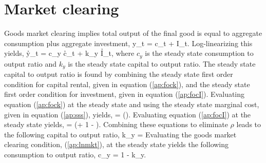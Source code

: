 \section{Market clearing}
Goods market clearing implies total output of the final good is equal to aggregate consumption plus aggregate investment,
\bdm y_t = c_t + I_t. \edm
Log-linearizing this yields,
\beq \label{ap:lnmkt} \h{y}_t = c_y \h{c}_t + \delta k_y \h{I}_t, \eeq
where $c_y$ is the steady state consumption to output ratio and $k_y$ is the steady state capital to output ratio.  The steady state capital to output ratio is found by combining the steady state first order condition for capital rental, given in equation (\ref{ap:fock}), and the steady state  first order condition for investment, given in equation (\ref{ap:focI}).  Evaluating equation (\ref{ap:fock}) at the steady state and using the steady state marginal cost, given in equation (\ref{ap:sss}), yields,
\bdm \rho = \alpha {} \left(\right). \edm
Evaluating equation (\ref{ap:focI}) at the steady state yields,
 = \beta \left(\rho + 1 - \delta \right). \edm
Combining these equations to eliminate $\rho$ leads to the following capital to output ratio,
\beq k_y =  \eeq
Evaluating the goods market clearing condition, (\ref{ap:lnmkt}), at the steady state yields the following consumption to output ratio,
\beq c_y = 1 - \delta k_y. \eeq
